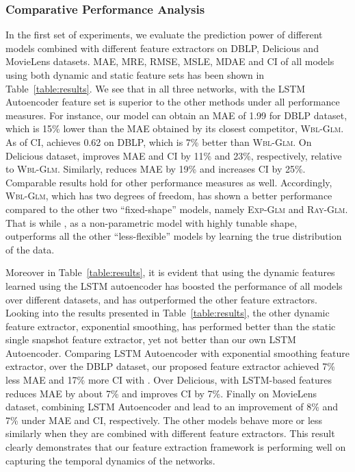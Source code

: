 \subsubsection{Comparative Performance Analysis}
In the first set of experiments, we evaluate the prediction power of different models combined with different feature extractors on DBLP, Delicious and MovieLens datasets. MAE, MRE, RMSE, MSLE, MDAE and CI of all models using both dynamic and static feature sets has been shown in Table~\ref{table:results}. We see that in all three networks, \npglm with the LSTM Autoencoder feature set is superior to the other methods under all performance measures. For instance, our model \npglm can obtain an MAE of 1.99 for DBLP dataset, which is 15\% lower than the MAE obtained by its closest competitor, \textsc{Wbl-Glm}. As of CI, \npglm achieves 0.62 on DBLP, which is 7\% better than \textsc{Wbl-Glm}. On Delicious dataset, \npglm improves MAE and CI by 11\% and 23\%, respectively, relative to \textsc{Wbl-Glm}. Similarly, \npglm reduces MAE by 19\% and increases CI by 25\%. Comparable results hold for other performance measures as well. Accordingly, \textsc{Wbl-Glm}, which has two degrees of freedom, has shown a better performance compared to the other two ``fixed-shape'' models, namely \textsc{Exp-Glm} and \textsc{Ray-Glm}. That is while \npglm, as a non-parametric model with highly tunable shape, outperforms all the other ``less-flexible'' models by learning the true distribution of the data.

{\color{red}Moreover in Table~\ref{table:results}, it is evident that using the dynamic features learned using the LSTM autoencoder has boosted the performance of all models over different datasets, and has outperformed the other feature extractors. Looking into the results presented in Table~\ref{table:results}, the other dynamic feature extractor, exponential smoothing, has performed better than the static single snapshot feature extractor, yet not better than our own LSTM Autoencoder. Comparing LSTM Autoencoder with exponential smoothing feature extractor, over the DBLP dataset, our proposed feature extractor achieved 7\% less MAE and 17\% more CI with \npglm. Over Delicious, \npglm with LSTM-based features reduces MAE by about 7\% and improves CI by 7\%. Finally on MovieLens dataset, combining LSTM Autoencoder and \npglm lead to an improvement of 8\% and 7\% under MAE and CI, respectively. The other models behave more or less similarly when they are combined with different feature extractors. This result clearly demonstrates that our feature extraction framework is performing well on capturing the temporal dynamics of the networks.}

